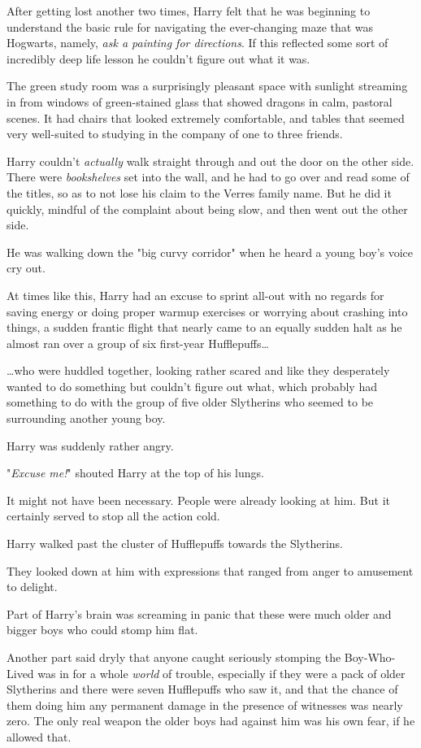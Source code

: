 After getting lost another two times, Harry felt that he was beginning to 
understand the basic rule for navigating the ever-changing maze that was 
Hogwarts, namely, \emph{ask a painting for directions}. If this reflected some 
sort of incredibly deep life lesson he couldn't figure out what it was.

The green study room was a surprisingly pleasant space with sunlight streaming 
in from windows of green-stained glass that showed dragons in calm, pastoral 
scenes. It had chairs that looked extremely comfortable, and tables that seemed 
very well-suited to studying in the company of one to three friends.

Harry couldn't \emph{actually} walk straight through and out the door on the 
other side. There were \emph{bookshelves} set into the wall, and he had to go 
over and read some of the titles, so as to not lose his claim to the Verres 
family name. But he did it quickly, mindful of the complaint about being slow, 
and then went out the other side.

He was walking down the "big curvy corridor" when he heard a young boy's voice 
cry out.

At times like this, Harry had an excuse to sprint all-out with no regards for 
saving energy or doing proper warmup exercises or worrying about crashing into 
things, a sudden frantic flight that nearly came to an equally sudden halt as 
he almost ran over a group of six first-year Hufflepuffs{\ldots}

{\ldots}who were huddled together, looking rather scared and like they 
desperately wanted to do something but couldn't figure out what, which probably 
had something to do with the group of five older Slytherins who seemed to be 
surrounding another young boy.

Harry was suddenly rather angry.

"\emph{Excuse me!}" shouted Harry at the top of his lungs.

It might not have been necessary. People were already looking at him. But it 
certainly served to stop all the action cold.

Harry walked past the cluster of Hufflepuffs towards the Slytherins.

They looked down at him with expressions that ranged from anger to amusement to 
delight.

Part of Harry's brain was screaming in panic that these were much older and 
bigger boys who could stomp him flat.

Another part said dryly that anyone caught seriously stomping the Boy-Who-Lived 
was in for a whole \emph{world} of trouble, especially if they were a pack of 
older Slytherins and there were seven Hufflepuffs who saw it, and that the 
chance of them doing him any permanent damage in the presence of witnesses was 
nearly zero. The only real weapon the older boys had against him was his own 
fear, if he allowed that.

